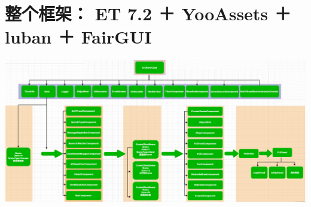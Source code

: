 \documentclass[9pt, b5paper]{article}
\begin{document}
\section{整个框架： ET 7.2 ＋ YooAssets ＋ luban ＋ FairGUI}
\label{sec-11}

\includegraphics[width=.9\linewidth]{./pic/ET_20230512_143227.png}
\end{document}
